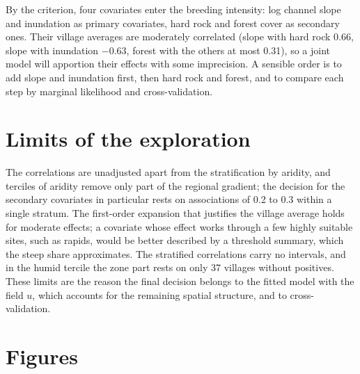 \documentclass[11pt,a4paper]{article}
\begin{document}
By the criterion, four covariates enter the breeding intensity: log channel slope and inundation as primary covariates, hard rock and forest cover as secondary ones. Their village averages are moderately correlated (slope with hard rock 0.66, slope with inundation $-0.63$, forest with the others at most 0.31), so a joint model will apportion their effects with some imprecision. A sensible order is to add slope and inundation first, then hard rock and forest, and to compare each step by marginal likelihood and cross-validation.

\section{Limits of the exploration}

The correlations are unadjusted apart from the stratification by aridity, and terciles of aridity remove only part of the regional gradient; the decision for the secondary covariates in particular rests on associations of 0.2 to 0.3 within a single stratum. The first-order expansion that justifies the village average holds for moderate effects; a covariate whose effect works through a few highly suitable sites, such as rapids, would be better described by a threshold summary, which the steep share approximates. The stratified correlations carry no intervals, and in the humid tercile the zone part rests on only 37 villages without positives. These limits are the reason the final decision belongs to the fitted model with the field $u$, which accounts for the remaining spatial structure, and to cross-validation.

\section*{Figures}
\end{document}
